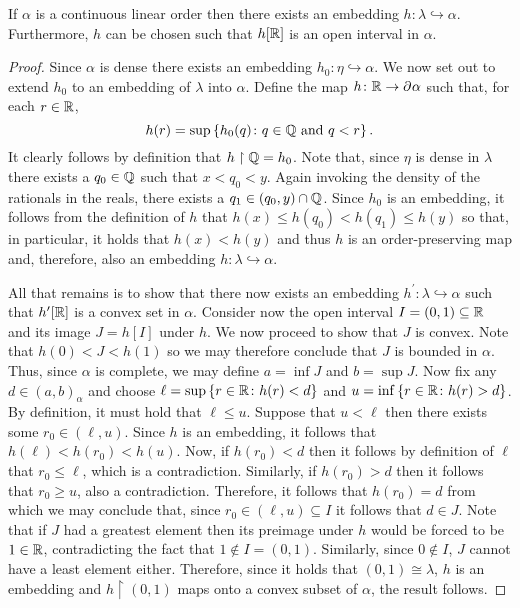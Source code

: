 \begin{prp}\label{prp:cont}
    If $\alpha$ is a continuous linear order then there exists an embedding
    $h\colon\lambda\hookrightarrow\alpha$.  Furthermore, $h$ can be chosen such
    that $h[\mathbb{R}]$ is an open interval in $\alpha$.
\end{prp}
\begin{proof}
    Since $\alpha$ is dense there exists an embedding
    $h_0\colon\eta\hookrightarrow\alpha$.  We now set out to extend $h_0$ to an
    embedding of $\lambda$ into $\alpha$.  Define the map
    $h\colon\mathbb{R}\to\partial^{}{}\alpha$ such that, for each $r\in\mathbb{R}$,
    \begin{equation} h(r)=\sup\left\lbrace h_0(q)\colon q\in\mathbb{Q}\text{ and }q<r \right\rbrace.
    \end{equation} It clearly follows by definition that
    $h\restriction\mathbb{Q}=h_0$.  Note that, since $\eta$ is dense in $\lambda$
    there exists a $q_0\in\mathbb{Q}$ such that $x<q_0<y$.  Again invoking the
    density of the rationals in the reals, there exists a
    $q_1\in(q_0,y)\cap\mathbb{Q}$.  Since $h_0$ is an embedding, it follows from the
    definition of $h$ that $h(x)\leq h(q_0)<h(q_1)\leq h(y)$ so that, in
    particular, it holds that $h(x)<h(y)$ and thus $h$ is an order-preserving
    map and, therefore, also an embedding $h\colon\lambda\hookrightarrow\alpha$.

    All that remains is to show that there now exists an embedding
    $h^\prime\colon\lambda\hookrightarrow\alpha$ such that $h^\prime[\mathbb{R}]$ is
    a convex set in $\alpha$.  Consider now the open interval
    $I=(0,1)\subseteq\mathbb{R}$ and its image $J=h[I]$ under $h$.  We now proceed
    to show that $J$ is convex.  Note that $h(0)<J<h(1)$ so we may therefore
    conclude that $J$ is bounded in $\alpha$.  Thus, since $\alpha$ is complete,
    we may define $a=\inf J$ and $b=\sup J$.  Now fix any $d\in(a,b)_\alpha$ and
    choose $\ell=\sup\left\lbrace r\in\mathbb{R}\colon h(r)<d \right\rbrace$ and
    $u=\inf\left\lbrace r\in\mathbb{R}\colon h(r)>d \right\rbrace$.  By definition, it must hold that
    $\ell\leq u$.  Suppose that $u<\ell$ then there exists some
    $r_0\in(\ell,u)$.  Since $h$ is an embedding, it follows that
    $h(\ell)<h(r_0)<h(u)$.  Now, if $h(r_0)<d$ then it follows by definition of
    $\ell$ that $r_0\leq\ell$, which is a contradiction.  Similarly, if
    $h(r_0)>d$ then it follows that $r_0\geq u$, also a contradiction.
    Therefore, it follows that $h(r_0)=d$ from which we may conclude that, since
    $r_0\in(\ell,u)\subseteq I$ it follows that $d\in J$.  Note that if $J$ had
    a greatest element then its preimage under $h$ would be forced to be
    $1\in\mathbb{R}$, contradicting the fact that $1\notin I=(0,1)$.  Similarly,
    since $0\notin I$, $J$ cannot have a least element either.  Therefore, since
    it holds that $(0,1)\cong\lambda$, $h$ is an embedding and
    $h\restriction(0,1)$ maps onto a convex subset of $\alpha$, the result
    follows.
\end{proof}

